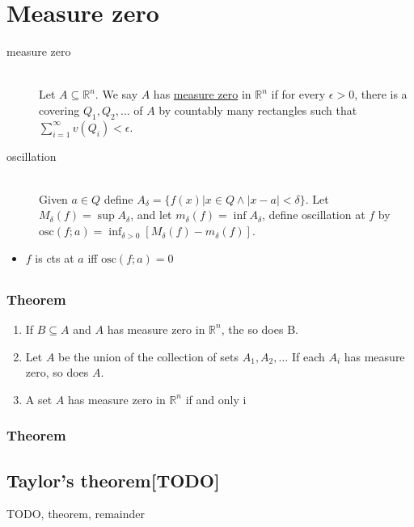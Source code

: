 \section{Measure zero}

\begin{description}
\item[measure zero] \hfill \\
	Let $A\subseteq \mathbb{R}^n$. We say $A$ has \underline{measure zero}
	in $\mathbb{R}^n$ if for every $\epsilon>0$, there is a covering $Q_1, Q_2, \dots$ of $A$
	by countably many rectangles such that
	$\sum_{i=1}^\infty v(Q_i)<\epsilon$.
\item[oscillation] \hfill \\
	Given $a\in Q$ define $A_\delta=\{f(x)|x\in Q \wedge |x-a|<\delta\}$.
	Let $M_\delta(f) = \sup A_\delta$, and let $m_\delta(f) = \inf A_\delta$,
	define oscillation at $f$ by $\mathrm{osc}(f;a)=\inf_{\delta>0}[M_\delta(f)-m_\delta(f)]$.
\end{description}

\begin{itemize}
 \item $f$ is cts at $a$ iff $\mathrm{osc}(f;a)=0$
\end{itemize}

\subsection{}
\subsubsection{Theorem }

\begin{enumerate}
  \item If $B \subseteq A$ and $A$ has measure zero in $\mathbb{R}^n$, the so does B.
  \item Let $A$ be the union of the collection of sets
        $A_1, A_2, \ldots$ If each $A_i$ has measure zero, so does $A$.
  \item A set $A$ has measure zero in $\mathbb{R}^n$ if and only i 
\end{enumerate}

\subsubsection{Theorem }




\subsection{Taylor’s theorem[TODO]}
\label{taylor}
TODO, theorem, remainder